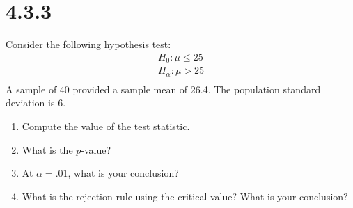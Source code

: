 \documentclass{article}
\begin{document}
\section*{4.3.3}
Consider the following hypothesis test:
\begin{align*}
  H_{0}: \mu \leq 25\\
  H_{\alpha}: \mu > 25\\
\end{align*}
A sample of 40 provided a sample mean of 26.4. The population standard deviation is 6.
\begin{enumerate}
  \item Compute the value of the test statistic.
  \item What is the $p$-value?
  \item At $\alpha = .01$, what is your conclusion?
  \item What is the rejection rule using the critical value? What is your conclusion?
\end{enumerate}
\end{document}
